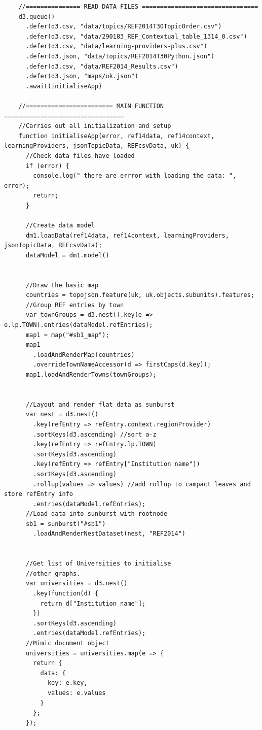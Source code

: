 \documentclass[a4paper, 11pt]{article}
\begin{document}
\begin{verbatim}
    //=============== READ DATA FILES ================================
    d3.queue()
      .defer(d3.csv, "data/topics/REF2014T30TopicOrder.csv")
      .defer(d3.csv, "data/290183_REF_Contextual_table_1314_0.csv")
      .defer(d3.csv, "data/learning-providers-plus.csv")
      .defer(d3.json, "data/topics/REF2014T30Python.json")
      .defer(d3.csv, "data/REF2014_Results.csv")
      .defer(d3.json, "maps/uk.json")
      .await(initialiseApp)

    //======================== MAIN FUNCTION =================================
    //Carries out all initialization and setup
    function initialiseApp(error, ref14data, ref14context, learningProviders, jsonTopicData, REFcsvData, uk) {
      //Check data files have loaded
      if (error) {
        console.log(" there are errror with loading the data: ", error);
        return;
      }

      //Create data model
      dm1.loadData(ref14data, ref14context, learningProviders, jsonTopicData, REFcsvData);
      dataModel = dm1.model()


      //Draw the basic map
      countries = topojson.feature(uk, uk.objects.subunits).features;
      //Group REF entries by town
      var townGroups = d3.nest().key(e => e.lp.TOWN).entries(dataModel.refEntries);
      map1 = map("#sb1_map");
      map1
        .loadAndRenderMap(countries)
        .overrideTownNameAccessor(d => firstCaps(d.key));
      map1.loadAndRenderTowns(townGroups);


      //Layout and render flat data as sunburst
      var nest = d3.nest()
        .key(refEntry => refEntry.context.regionProvider)
        .sortKeys(d3.ascending) //sort a-z
        .key(refEntry => refEntry.lp.TOWN)
        .sortKeys(d3.ascending)
        .key(refEntry => refEntry["Institution name"])
        .sortKeys(d3.ascending)
        .rollup(values => values) //add rollup to campact leaves and store refEntry info
        .entries(dataModel.refEntries);
      //Load data into sunburst with rootnode
      sb1 = sunburst("#sb1")
        .loadAndRenderNestDataset(nest, "REF2014")


      //Get list of Universities to initialise
      //other graphs.
      var universities = d3.nest()
        .key(function(d) {
          return d["Institution name"];
        })
        .sortKeys(d3.ascending)
        .entries(dataModel.refEntries);
      //Mimic document object
      universities = universities.map(e => {
        return {
          data: {
            key: e.key,
            values: e.values
          }
        };
      });



\end{verbatim}
\end{document}
